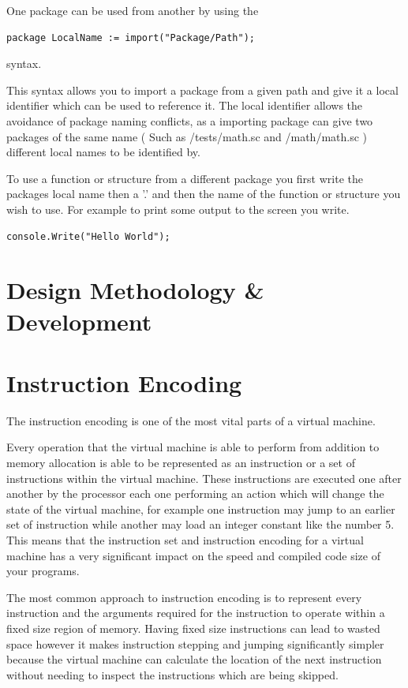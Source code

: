 \documentclass[]{final_report}
\begin{document}
One package can be used from another by using the
\begin{verbatim}
package LocalName := import("Package/Path");
\end{verbatim}
syntax.

This syntax allows you to import a package from a given path and give it a local identifier which can be used to reference it. The local identifier allows the avoidance of package naming conflicts, as a importing package can give two packages of the same name ( Such as /tests/math.sc and /math/math.sc ) different local names to be identified by.

To use a function or structure from a different package you first write the packages local name then a '.' and then the name of the function or structure you wish to use. For example to print some output to the screen you write.

\begin{verbatim}
console.Write("Hello World");
\end{verbatim}

\chapter{Design Methodology \& Development}

\chapter{Instruction Encoding}

The instruction encoding is one of the most vital parts of a virtual machine.

Every operation that the virtual machine is able to perform from addition to memory allocation is able to be represented as an instruction or a set of instructions within the virtual machine.
These instructions are executed one after another by the processor each one performing an action which will change the state of the virtual machine, for example one instruction may jump to an earlier set of instruction while another may load an integer constant like the number 5.
This means that the instruction set and instruction encoding for a virtual machine has a very significant impact on the speed and compiled code size of your programs.

The most common approach to instruction encoding is to represent every instruction and the arguments required for the instruction to operate within a fixed size region of memory. Having fixed size instructions can lead to wasted space however it makes instruction stepping and jumping significantly simpler because the virtual machine can calculate the location of the next instruction without needing to inspect the instructions which are being skipped.
\end{document}
